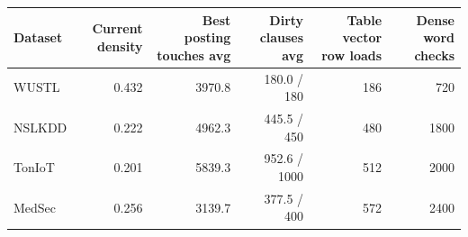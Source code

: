 \begin{tabular}{lrrrrr}
\toprule
Dataset & Current density & Best posting touches avg & Dirty clauses avg & Table vector row loads & Dense word checks \\
\midrule
WUSTL & 0.432 & 3970.8 & 180.0 / 180 & 186 & 720 \\
NSLKDD & 0.222 & 4962.3 & 445.5 / 450 & 480 & 1800 \\
TonIoT & 0.201 & 5839.3 & 952.6 / 1000 & 512 & 2000 \\
MedSec & 0.256 & 3139.7 & 377.5 / 400 & 572 & 2400 \\
\bottomrule
\end{tabular}
